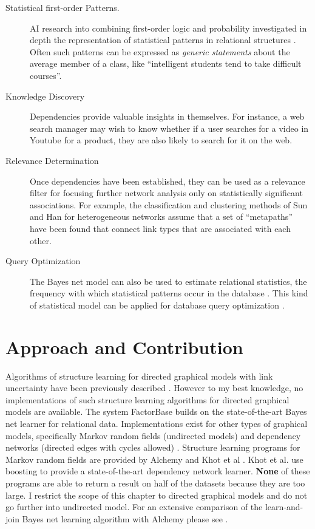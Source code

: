 \documentclass{sfuthesis}
\begin{document}
\begin{description}
\item[Statistical first-order Patterns.] AI research into combining first-order logic and probability investigated in depth the representation of statistical patterns in relational structures \cite{Halpern90,Bacchus90}. Often such patterns can be expressed as {\em generic statements} about the average member of a class, like ``intelligent students tend to take difficult courses''. 
\item[Knowledge Discovery] Dependencies provide valuable insights in themselves. For instance, a web search manager may wish to know whether if a user searches for a video in Youtube for a product, they are also likely to search for it on the web. 
\item[Relevance Determination] Once dependencies have been established, they can be used as a relevance filter for focusing further network analysis only on statistically significant associations. For example, the classification and clustering methods of Sun and Han \cite{Sun2012} for heterogeneous networks assume that a set of ``metapaths'' have been found that connect link types that are associated with each other. 
\item[Query Optimization] The Bayes net model can also be used to estimate relational statistics, the frequency with which statistical patterns occur in the database \cite{Schulte2012b}. This kind of statistical model can be applied for database query optimization \cite{Getoor2001}.
\end{description}


\section{Approach and Contribution} %
Algorithms of structure learning for directed graphical models with link uncertainty have been previously described \cite{Getoor2007c}. However to my best knowledge, no implementations of such structure learning algorithms for directed graphical models are available. The system FactorBase builds on the state-of-the-art Bayes net learner for relational data.
Implementations exist for other types of graphical models, specifically Markov random fields (undirected models) \cite{Domingos2009} and dependency networks (directed edges with cycles allowed) \cite{Natarajan2012}. Structure learning programs for Markov random fields are provided by Alchemy \cite{Domingos2009} and Khot et al \cite{Khot2013}. Khot et al. use boosting to provide a state-of-the-art dependency network learner. \textbf{None} of these programs are able to return a result on half of the datasets because they are too large. I restrict the scope of this chapter to directed graphical models and do not go further into undirected model. For an extensive comparison of the learn-and-join Bayes net learning algorithm with Alchemy please see \cite{Schulte2012}.
\end{document}
